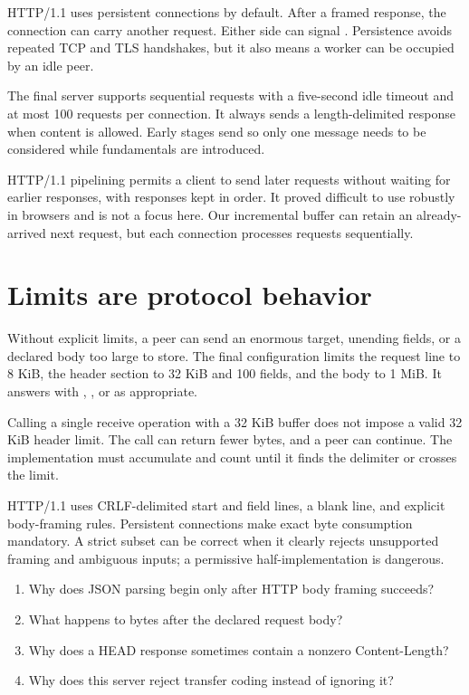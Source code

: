 HTTP/1.1 uses persistent connections by default. After a framed response, the
connection can carry another request. Either side can signal
. Persistence avoids repeated TCP and TLS handshakes,
but it also means a worker can be occupied by an idle peer.

The final server supports sequential requests with a five-second idle timeout
and at most 100 requests per connection. It always sends a length-delimited
response when content is allowed. Early stages send  so
only one message needs to be considered while fundamentals are introduced.

HTTP/1.1 pipelining permits a client to send later requests without waiting for
earlier responses, with responses kept in order. It proved difficult to use
robustly in browsers and is not a focus here. Our incremental buffer can retain
an already-arrived next request, but each connection processes requests
sequentially.

\section{Limits are protocol behavior}

Without explicit limits, a peer can send an enormous target, unending fields, or
a declared body too large to store. The final configuration limits the request
line to 8 KiB, the header section to 32 KiB and 100 fields, and the body to 1 MiB.
It answers with , , or  as appropriate.

\begin{pitfall}
Calling a single receive operation with a 32 KiB buffer does not impose a valid
32 KiB header limit. The call can return fewer bytes, and a peer can continue.
The implementation must accumulate and count until it finds the delimiter or
crosses the limit.
\end{pitfall}

\summarytitle

HTTP/1.1 uses CRLF-delimited start and field lines, a blank line, and explicit
body-framing rules. Persistent connections make exact byte consumption mandatory.
A strict subset can be correct when it clearly rejects unsupported framing and
ambiguous inputs; a permissive half-implementation is dangerous.

\reviewtitle
\begin{enumerate}
  \item Why does JSON parsing begin only after HTTP body framing succeeds?
  \item What happens to bytes after the declared request body?
  \item Why does a HEAD response sometimes contain a nonzero Content-Length?
  \item Why does this server reject transfer coding instead of ignoring it?
\end{enumerate}

